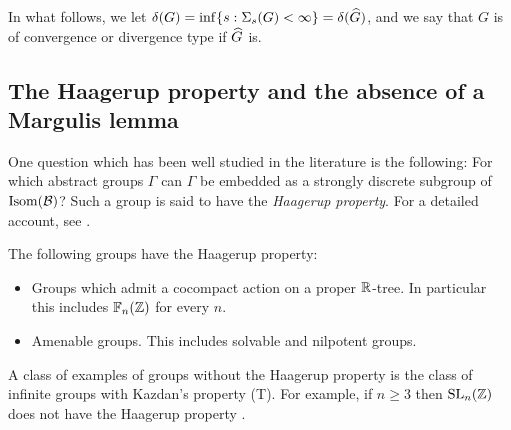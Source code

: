 In what follows, we let $\delta(G) = \inf\{s : \Sigma_s(G) < \infty\} = \delta(\widehat G)$, and we say that $G$ is of convergence or divergence type if $\widehat G$ is.

\subsection{The Haagerup property and the absence of a Margulis lemma}
\label{subsubsectionhaagerup}
One question which has been well studied in the literature is the following: For which abstract groups $\Gamma$ can $\Gamma$ be embedded as a strongly discrete subgroup of $\operatorname{Isom}(\mathcal B)$? Such a group is said to have the \emph{Haagerup property}. For a detailed account, see \cite{CCJJV}.

\begin{remark}
\label{remarkhaagerup}
The following groups have the Haagerup property:
\begin{itemize}
\item \cite[pp.73-74]{HarpeValette} Groups which admit a cocompact action on a proper $\R$-tree. In particular this includes $\F_n(\Z)$ for every $n$.
\item \cite{Jolissaint} Amenable groups. This includes solvable and nilpotent groups.
\end{itemize}
A class of examples of groups without the Haagerup property is the class of infinite groups with Kazdan's property (T). For example, if $n\geq 3$ then $\SL_n(\Z)$ does not have the Haagerup property \cite[]{BHV}.
\end{remark}

